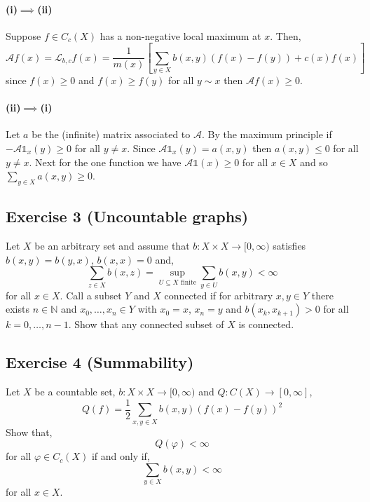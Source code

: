 \paragraph{(i)$\implies$(ii)}
Suppose $f\in C_{c}(X)$ has a non-negative local maximum at $x$. Then,
\begin{equation*}
	\mathcal{A}f(x) = \mathcal{L}_{b,c}f(x) = \frac{1}{m(x)}\left[\sum_{y\in X}b(x,y)(f(x) - f(y)) + c(x)f(x)\right]
\end{equation*}
since $f(x)\geq 0$ and $f(x)\geq f(y)$ for all $y\sim x$ then $\mathcal{A}f(x)\geq 0$.

\paragraph{(ii)$\implies$(i)}
Let $a$ be the (infinite) matrix associated to $\mathcal{A}$. By the maximum principle if $-\mathcal{A}\mathds{1}_{x}(y)\geq 0$ for all $y\neq x$. Since $\mathcal{A}\mathds{1}_{x}(y) = a(x,y)$ then $a(x,y)\leq 0$ for all $y\neq x$. Next for the one function we have $\mathcal{A}\mathds{1}(x)\geq 0$ for all $x\in X$ and so $\sum_{y\in X}a(x,y)\geq 0$.

\subsection{Exercise 3 (Uncountable graphs)}

Let $X$ be an arbitrary set and assume that $b:X\times X\to [0,\infty)$ satisfies $b(x,y) = b(y,x)$, $b(x,x)=0$ and,
\begin{equation*}
	\sum_{z\in X}b(x,z) = \sup_{U\subseteq X\text{ finite}}\sum_{y\in U}b(x,y)<\infty
\end{equation*}
for all $x\in X$. Call a subset $Y$ and $X$ connected if for arbitrary $x,y\in Y$ there exists $n\in\mathbb{N}$ and $x_{0},\ldots,x_{n}\in Y$ with $x_{0}=x$, $x_{n}=y$ and $b(x_{k}, x_{k+1})>0$ for all $k=0,\ldots,n-1$. Show that any connected subset of $X$ is connected.

\subsection{Exercise 4 (Summability)}

Let $X$ be a countable set, $b:X\times X\to [0,\infty)$ and $Q:C(X)\to[0,\infty]$,
\begin{equation*}
	Q(f) = \frac{1}{2}\sum_{x,y\in X}b(x,y)(f(x) - f(y))^{2}
\end{equation*}
Show that,
\begin{equation*}
	Q(\varphi)<\infty
\end{equation*}
for all $\varphi\in C_{c}(X)$ if and only if,
\begin{equation*}
	\sum_{y\in X}b(x,y)<\infty
\end{equation*}
for all $x\in X$.
